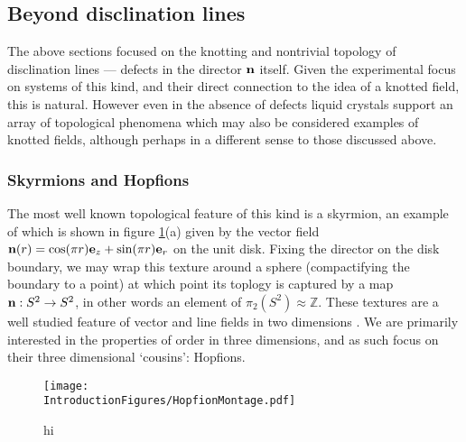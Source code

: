 \subsection{Beyond disclination lines}
The above sections focused on the knotting and nontrivial topology of disclination lines --- defects in the director $\bf n$ itself. Given the experimental focus on systems of this kind, and their direct connection to the idea of a knotted field, this is natural. However even in the absence of defects liquid crystals support an array of topological phenomena which may also be considered examples of knotted fields, although perhaps in a different sense to those discussed above. 

\subsubsection{Skyrmions and Hopfions}
The most well known topological feature of this kind is a skyrmion, an example of which is shown in figure \ref{fig:HopfionMontage}(a) given by the vector field ${\bf n}(r) = \cos(\pi r) {\bf e}_z + \sin(\pi r) {\bf e}_r$ on the unit disk. Fixing the director on the disk boundary, we may wrap this texture around a sphere (compactifying the boundary to a point) at which point its toplogy is captured by a map ${\bf n} : S^2 \rightarrow S^2$, in other words an element of $\pi_2 (S^2)\approx \mathbb{Z}$. These textures are a well studied feature of vector and line fields in two dimensions \cite{GarethBook}. We are primarily interested in the properties of order in three dimensions, and as such focus on their three dimensional `cousins': Hopfions.
\begin{figure}[htbp]
\centering
\texttt{[image: \\IntroductionFigures/HopfionMontage.pdf]}
\caption{hi }
\label{fig:HopfionMontage}
\end{figure}

